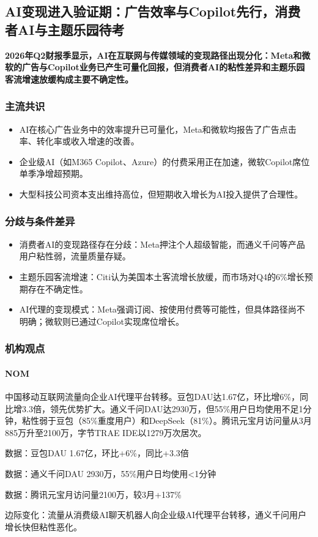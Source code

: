 \documentclass[11pt]{ctexart}
\begin{document}
\subsection{AI变现进入验证期：广告效率与Copilot先行，消费者AI与主题乐园待考}
\textbf{2026年Q2财报季显示，AI在互联网与传媒领域的变现路径出现分化：Meta和微软的广告与Copilot业务已产生可量化回报，但消费者AI的粘性差异和主题乐园客流增速放缓构成主要不确定性。}
\subsubsection*{主流共识}
\begin{itemize}
  \item AI在核心广告业务中的效率提升已可量化，Meta和微软均报告了广告点击率、转化率或收入增速的改善。
  \item 企业级AI（如M365 Copilot、Azure）的付费采用正在加速，微软Copilot席位单季净增超预期。
  \item 大型科技公司资本支出维持高位，但短期收入增长为AI投入提供了合理性。
\end{itemize}
\subsubsection*{分歧与条件差异}
\begin{itemize}
  \item 消费者AI的变现路径存在分歧：Meta押注个人超级智能，而通义千问等产品用户粘性弱，流量质量存疑。
  \item 主题乐园客流增速：Citi认为美国本土客流增长放缓，而市场对Q4的6\%增长预期存在不确定性。
  \item AI代理的变现模式：Meta强调订阅、按使用付费等可能性，但具体路径尚不明确；微软则已通过Copilot实现席位增长。
\end{itemize}
\subsubsection*{机构观点}
\paragraph{NOM} 中国移动互联网流量向企业AI代理平台转移。豆包DAU达1.67亿，环比增6\%，同比增3.3倍，领先优势扩大。通义千问DAU达2930万，但55\%用户日均使用不足1分钟，粘性弱于豆包（85\%重度用户）和DeepSeek（81\%）。腾讯元宝月访问量从3月885万升至2100万，字节TRAE IDE以1279万次居次。
{\small\color{refgray}数据：豆包DAU 1.67亿，环比+6\%，同比+3.3倍\par}
{\small\color{refgray}数据：通义千问DAU 2930万，55\%用户日均使用<1分钟\par}
{\small\color{refgray}数据：腾讯元宝月访问量2100万，较3月+137\%\par}
{\small\color{refgray}边际变化：流量从消费级AI聊天机器人向企业级AI代理平台转移，通义千问用户增长快但粘性恶化。\par}
\end{document}

